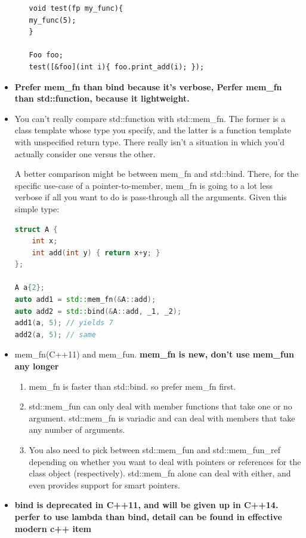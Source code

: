\documentclass[a4paper,11pt,twoside]{book}
\begin{document}
\begin{itemize}
\begin{enumerate}
\begin{lstlisting}[numbers=none]
void test(fp my_func){
my_func(5);
}

Foo foo;
test([&foo](int i){ foo.print_add(i); });
\end{lstlisting}
	
	\end{enumerate}

	\item \textbf{Prefer mem\_fn than bind because it's verbose, Perfer mem\_fn  than std::function, because it lightweight.}
	
	\item You can't really compare std::function with std::mem\_fn. The former is a class template whose type you specify, and the latter is a function template with unspecified return type. There really isn't a situation in which you'd actually consider one versus the other.
	
	A better comparison might be between mem\_fn and std::bind. There, for the specific use-case of a pointer-to-member, mem\_fn is going to a lot less verbose if all you want to do is pass-through all the arguments. Given this simple type:
\begin{lstlisting}[frame=single, language=c++]
struct A { 
	int x;
	int add(int y) { return x+y; }
};
	
A a{2};
auto add1 = std::mem_fn(&A::add);
auto add2 = std::bind(&A::add, _1, _2);
add1(a, 5); // yields 7
add2(a, 5); // same
	\end{lstlisting}
	
	\item mem\_fn(C++11) and mem\_fun. \textbf{mem\_fn is new, don't use mem\_fun any longer}
	
	\begin{enumerate}
		\item mem\_fn is faster than std::bind.  so prefer mem\_fn first.
		
		\item std::mem\_fun can only deal with member functions that take one or no argument. std::mem\_fn is variadic and can deal with members that take any number of arguments.
		
		\item You also need to pick between std::mem\_fun and std::mem\_fun\_ref depending on whether you want to deal with pointers or references for the class object (respectively). std::mem\_fn alone can deal with either, and even provides support for smart pointers.
	\end{enumerate}

	\item \textbf{bind is deprecated in C++11, and will be given up in C++14. perfer to use lambda than bind, detail can be found in effective modern c++ item }
\end{itemize}
\end{document}
